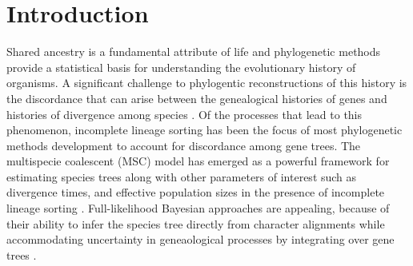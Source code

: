 \section{Introduction}

Shared ancestry is a fundamental attribute of life and phylogenetic methods 
provide a statistical basis for understanding the evolutionary history of organisms.
A significant challenge to phylogentic reconstructions of this history is the 
discordance that can arise between the genealogical histories of genes and 
histories of divergence among species \citep{maddisonGeneTreesSpecies1997}.
Of the processes that lead to this phenomenon, incomplete lineage sorting has 
been the focus of most phylogenetic methods development to account for discordance
among gene trees. The multispecie coalescent (MSC) model has emerged as a 
powerful framework for estimating species trees along with other parameters of 
interest such as divergence times, and effective population sizes in the 
presence of incomplete lineage sorting \citep{xuChallengesSpeciesTree2016}.
Full-likelihood Bayesian approaches are appealing, because of their ability to
infer the species tree directly from character alignments while accommodating
uncertainty in geneaological processes by integrating over gene trees
\citep{rannalaEfficientBayesianSpecies2017}.

